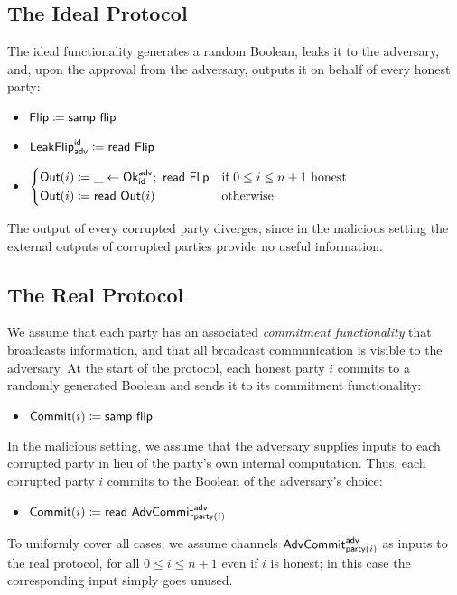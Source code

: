 \subsection{The Ideal Protocol}
The ideal functionality generates a random Boolean, leaks it to the adversary, and, upon the approval from the adversary, outputs it on behalf of every honest party:
\begin{itemize}
\item $\mathsf{Flip} \coloneqq \mathsf{samp} \ \mathsf{flip}$
\item $\mathsf{LeakFlip}^{\mathsf{id}}_{\mathsf{adv}} \coloneqq \mathsf{read} \ \mathsf{Flip}$
\item $\begin{cases*} \Out(i) \coloneqq \_ \leftarrow \Ok^\adv_\id; \ \read{\Flip} & \text{if $0 \leq i \leq n+1$ honest} \\ \Out(i) \coloneqq \read{\Out(i)} & \text{otherwise} \end{cases*}$
\end{itemize}
The output of every corrupted party diverges, since in the malicious setting the external outputs of corrupted parties provide no useful information.

\subsection{The Real Protocol}
We assume that each party has an associated \emph{commitment functionality} that broadcasts information, and that all broadcast communication is visible to the adversary. At the start of the protocol, each honest party $i$ commits to a randomly generated Boolean and sends it to its commitment functionality:
\begin{itemize}
\item {\color{blue} $\mathsf{Commit}(i) \coloneqq \mathsf{samp} \ \mathsf{flip}$}
\end{itemize}
In the malicious setting, we assume that the adversary supplies inputs to each corrupted party in lieu of the party's own internal computation. Thus, each corrupted party $i$ commits to the Boolean of the adversary's choice:
\begin{itemize}
\item {\color{blue} $\mathsf{Commit}(i) \coloneqq \mathsf{read} \ \mathsf{AdvCommit}^{\mathsf{adv}}_{\mathsf{party}(i)}$}
\end{itemize}
To uniformly cover all cases, we assume channels $\mathsf{AdvCommit}^{\mathsf{adv}}_{\mathsf{party}(i)}$ as inputs to the real protocol, for all $0 \leq i \leq n+1$ even if $i$ is honest; in this case the corresponding input simply goes unused.

